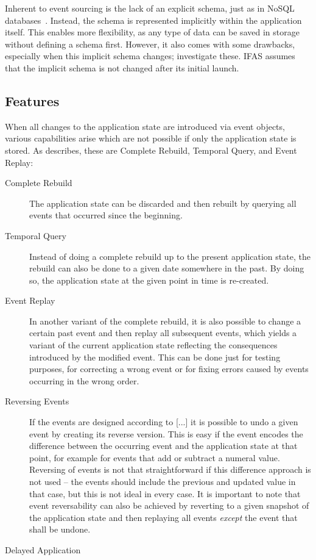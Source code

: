 Inherent to event sourcing is the lack of an explicit schema, just as in NoSQL databases~\cite{fowler2013schemaless}.
Instead, the schema is represented implicitly within the application itself.
This enables more flexibility, as any type of data can be saved in storage without defining a schema first.
However, it also comes with some drawbacks, especially when this implicit schema changes; \citet{Overeem2017} investigate these.
\ac{IFAS} assumes that the implicit schema is not changed after its initial launch.

\subsection{Features}

When all changes to the application state are introduced via event objects, various capabilities arise which are not possible if only the application state is stored.
As \citet{WEB:Fowler:2005} describes, these are Complete Rebuild, Temporal Query, and Event Replay:

\begin{description}
\item [Complete Rebuild]
The application state can be discarded and then rebuilt by querying all events that occurred since the beginning.
\item [Temporal Query]
Instead of doing a complete rebuild up to the present application state, the rebuild can also be done to a given date somewhere in the past.
By doing so, the application state at the given point in time is re-created.
\item [Event Replay]
In another variant of the complete rebuild, it is also possible to change a certain past event and then replay all subsequent events, which yields a variant of the current application state reflecting the consequences introduced by the modified event.
This can be done just for testing purposes, for correcting a wrong event or for fixing errors caused by events occurring in the wrong order.
\item [Reversing Events]
If the events are designed according to [...] it is possible to undo a given event by creating its reverse version.
This is easy if the event encodes the difference between the occurring event and the application state at that point, for example for events that add or subtract a numeral value.
Reversing of events is not that straightforward if this difference approach is not used -- the events should include the previous and updated value in that case, but this is not ideal in every case.
It is important to note that event reversability can also be achieved by reverting to a given snapshot of the application state and then replaying all events \emph{except} the event that shall be undone.
\item [Delayed Application]
\end{description}

